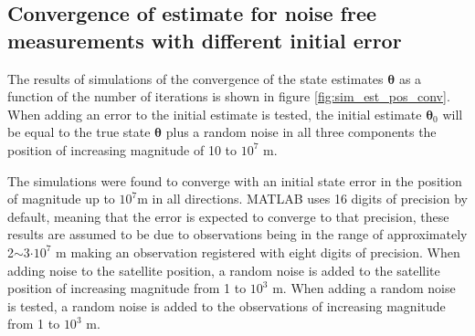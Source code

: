 \subsection{Convergence of estimate for noise free measurements with different initial error}
The results of simulations of the convergence of the state estimates $\boldsymbol \theta$ as a function of the number of iterations is shown in figure \ref{fig:sim_est_pos_conv}. When adding an error to the initial estimate is tested, the initial estimate ${\boldsymbol \theta}_0$ will be equal to the true state ${\boldsymbol \theta}$ plus a random noise in all three components the position of increasing magnitude of 10 to $10^7$ m. 
\par
The simulations were found to converge with an initial state error in the position of magnitude up to $10^7$m in all directions. MATLAB uses 16 digits of precision by default, meaning that the error is expected to converge to that precision, these results are assumed to be due to observations being in the range of approximately 2$\sim$3$\cdot 10^7$ m making an observation registered with eight digits of precision. When adding noise to the satellite position, a random noise is added to the satellite position of increasing magnitude from 1 to $10^3$ m. When adding a random noise is tested, a random noise is added to the observations of increasing magnitude from 1 to $10^3$ m. 
\par 
